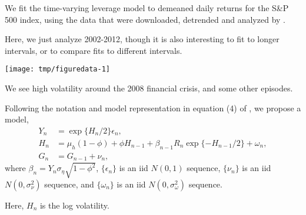 \documentclass{beamer}
\begin{document}
\begin{frame}[fragile]

\bi

\item We fit the time-varying leverage model to demeaned daily returns for the S&P 500 index, using the data that were downloaded, detrended and analyzed by \citet{breto14}. 

\item Here, we just analyze 2002-2012, though it is also interesting to fit to longer intervals, or to compare fits to different intervals.

\ei

\begin{knitrout}\small
{}\color{fgcolor}\begin{kframe}
\begin{alltt}
\hlstd{(}\hlstd{=}\hlstd{)}
\hlstd{=}\hlstd{,}\hlstd{=}\hlstd{,} \hlstd{=}\hlstd{)}
\end{alltt}
\end{kframe}

{\centering \texttt{[image: tmp/figuredata-1]} 

}



\end{knitrout}

\bi

\item We see high volatility around the 2008 financial crisis, and some other episodes.

\item Following the notation and model representation in equation (4) of \citet{breto14}, we propose a model,
$$
\begin{align} 
Y_n &= \exp\{H_n/2\} \epsilon_n, \\
H_n &= \mu_h(1-\phi) + \phi H_{n-1} +
\beta_{n-1}R_n\exp\{-H_{n-1}/2\} + \omega_n,\\
G_n &= G_{n-1}+\nu_n,
\end{align}
$$
where $\beta_n=Y_n\sigma_\eta\sqrt{1-\phi^2}$, $\{\epsilon_n\}$ is an iid $N(0,1)$ sequence, $\{\nu_n\}$ is an iid $N(0,\sigma_{\nu}^2)$ sequence, and $\{\omega_n\}$ is an iid $N(0,\sigma_\omega^2)$ sequence.

\item Here, $H_n$ is the log volatility.

\ei

\end{frame}
\end{document}
